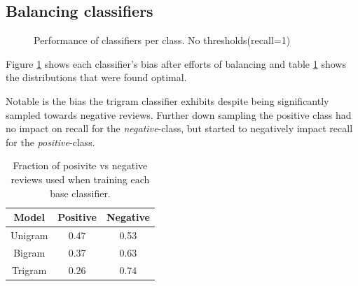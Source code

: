 \documentclass[a4paper,11pt]{kth-mag}
\begin{document}
\newpage

\subsection{Balancing classifiers}
\begin{figure}[h]
  \centering
  \caption{Performance of classifiers per class. No thresholds(recall=1)}
  \label{fig:sent_bias}
\end{figure}

Figure \ref{fig:sent_bias} shows each classifier's bias after efforts of balancing and table \ref{tab:sent_balances}
shows the distributions that were found optimal.

Notable is the bias the trigram classifier exhibits despite being significantly sampled towards negative reviews.
Further down sampling the positive class had no impact on recall for the \emph{negative}-class, but started to
negatively impact recall for the \emph{positive}-class.


\begin{table}[b]
  \centering
  \begin{tabular}{| c | c | c |}
    \hline
    \textbf{Model} & \textbf{Positive} & \textbf{Negative}\\ \hline
    Unigram&0.47& 0.53\\
    Bigram&0.37&0.63\\
    Trigram&0.26&0.74\\
    \hline
  \end{tabular}
  \caption{Fraction of posivite vs negative reviews used when training each base classifier.}
  \label{tab:sent_balances}
\end{table}
\end{document}
